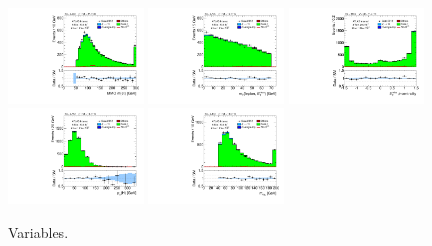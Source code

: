 \begin{figure}[tp]
  \includegraphics[width=0.32\textwidth]{figures/analysis/vbf-QCDCR/mMMC}
  \includegraphics[width=0.32\textwidth]{figures/analysis/vbf-QCDCR/mT}
  \includegraphics[width=0.32\textwidth]{figures/analysis/vbf-QCDCR/met-phi-centrality}
  \includegraphics[width=0.32\textwidth]{figures/analysis/vbf-QCDCR/H-pt-hi}
  \includegraphics[width=0.32\textwidth]{figures/analysis/vbf-QCDCR/mvis}
  \caption{Variables.}
  \label{fig:backgrounds-QCDCR-taus}
\end{figure}


